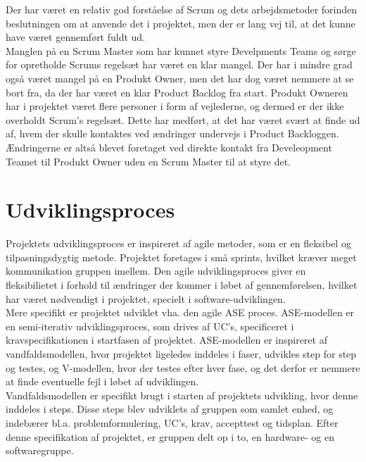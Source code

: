 \newline        
Der har været en relativ god forståelse af Scrum og dets arbejdsmetoder forinden beslutningen om at anvende det i projektet, men der er lang vej til, at det kunne have været gennemført fuldt ud. \\
Manglen på en Scrum Master som har kunnet styre Develpments Teams og sørge for opretholde Scrums regelsæt har været en klar mangel. 
Der har i mindre grad også været mangel på en Produkt Owner, men det har dog været nemmere at se bort fra, da der har været en klar Product Backlog fra start. Produkt Owneren har i projektet været flere personer i form af vejlederne, og dermed er der ikke overholdt Scrum’s regelsæt. Dette har medført, at det har været svært at finde ud af, hvem der skulle kontaktes ved ændringer undervejs i Product Backloggen. Ændringerne er altså blevet foretaget ved direkte kontakt fra Develeopment Teamet til Produkt Owner uden en Scrum Master til at styre det. 

\section{Udviklingsproces}
Projektets udviklingsproces er inspireret af agile metoder, som er en fleksibel og tilpasningsdygtig metode. Projektet foretages i små sprints, hvilket kræver meget kommunikation gruppen imellem. Den agile udviklingsproces giver en fleksibilietet i forhold til ændringer der kommer i løbet af gennemførelsen, hvilket har været nødvendigt i projektet, specielt i software-udviklingen.\\
\newline
Mere specifikt er projektet udviklet vha. den agile ASE proces. ASE-modellen er en semi-iterativ udviklingsproces, som drives af UC's, specificeret i kravspecifikationen i startfasen af projektet. ASE-modellen er inspireret af vandfaldsmodellen, hvor projektet ligeledes inddeles i faser, udvikles step for step og testes, og V-modellen, hvor der testes efter hver fase, og det derfor er nemmere at finde eventuelle fejl i løbet af udviklingen.\\
\newline
Vandfaldsmodellen er specifikt brugt i starten af projektets udvikling, hvor denne inddeles i steps. Disse steps blev udviklets af gruppen som samlet enhed, og indebærer bl.a. problemformulering, UC's, krav, accepttest og tidsplan. Efter denne specifikation af projektet, er gruppen delt op i to, en hardware- og en softwaregruppe.

